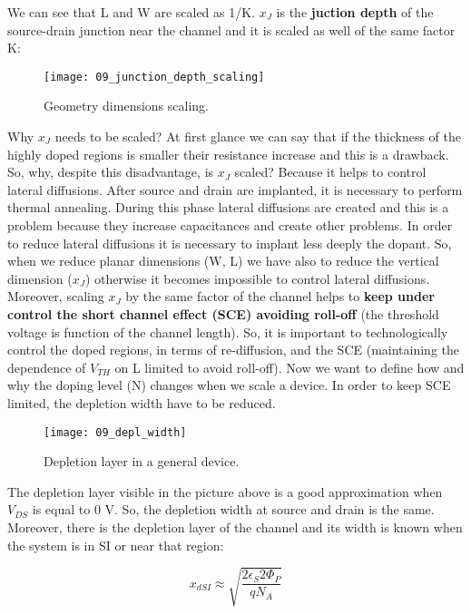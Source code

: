 \documentclass[a4paper, 12pt, twoside, openright]{report}
\begin{document}
\begin{enumerate}
We can see that L and W are scaled as 1/K. $x_{J}$ is the \textbf{juction depth} of the source-drain junction near the channel and it is scaled as well of the same factor K:

	\begin{figure}[h]
	\centering
	\texttt{[image: 09\_junction\_depth\_scaling]}
	\caption{Geometry dimensions scaling.}
	\label{}
	\end{figure}

Why $x_{J}$ needs to be scaled? At first glance we can say that if the thickness of the highly doped regions is smaller their resistance increase and this is a drawback. So, why, despite this disadvantage, is $x_{J}$ scaled? Because it helps to control lateral diffusions. After source and drain are implanted, it is necessary to perform thermal annealing. During this phase lateral diffusions are created and this is a problem because they increase capacitances and create other problems. In order to reduce lateral diffusions it is necessary to implant less deeply the dopant. So, when we reduce planar dimensions (W, L) we have also to reduce the vertical dimension ($x_{J}$) otherwise it becomes impossible to control lateral diffusions. Moreover, scaling $x_{J}$ by the same factor of the channel helps to \textbf{keep under control the short channel effect (SCE) avoiding roll-off} (the threshold voltage is function of the channel length).
So, it is important to technologically control the doped regions, in terms of re-diffusion, and the SCE (maintaining the dependence of $V_{TH}$ on L limited to avoid roll-off).
Now we want to define how and why the doping level (N) changes when we scale a device. In order to keep SCE limited, the depletion width have to be reduced.

	\begin{figure}[H]
	\centering
	\texttt{[image: 09\_depl\_width]}
	\caption{Depletion layer in a general device.}
	\label{}
	\end{figure}

The depletion layer visible in the picture above is a good approximation when $V_{DS}$ is equal to 0 V. So, the depletion width at source and drain is the same. Moreover, there is the depletion layer of the channel and its width is known when the system is in SI or near that region:

	\begin{equation}
	x_{dSI} \approx \sqrt{\frac{2 \epsilon_S 2 \Phi_P}{q N_A}}
	\label{}
	\end{equation}


\end{enumerate}
\end{document}
